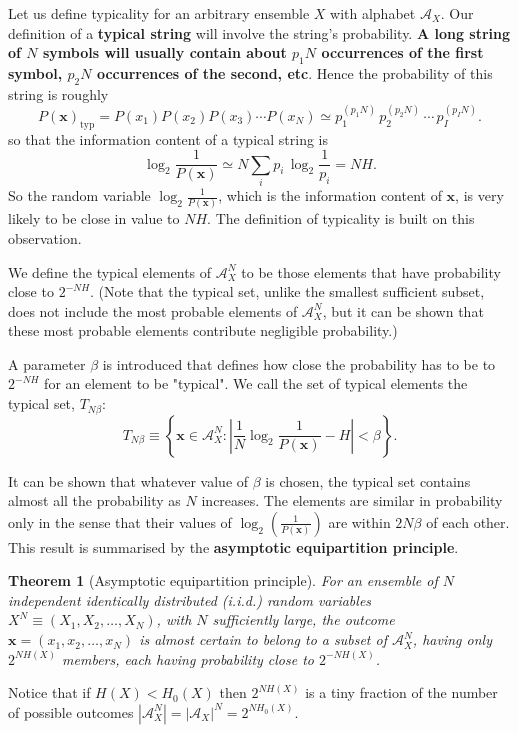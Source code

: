 \documentclass[11pt]{article}
\newtheorem{theorem}{Theorem}
\begin{document}
Let us define typicality for an arbitrary ensemble $X$ with alphabet $\mathcal{A}_X$. Our definition of a \textbf{typical string} will involve the string's probability. \textbf{A long string of $N$ symbols will usually contain about $p_1N$ occurrences of the first symbol, $p_2N$ occurrences of the second, etc}. Hence the probability of this string is roughly
\[
  P(\mathbf{x})_{\mathrm{typ}} = P(x_1)P(x_2)P(x_3)\cdots P(x_N) \simeq p_1^{(p_1N)}\,p_2^{(p_2N)}\,\cdots\,p_I^{(p_IN)}.
\]
so that the information content of a typical string is
\[
  \log_2\frac{1}{P(\mathbf{x})} \simeq N\sum_i p_i\,\log_2\frac{1}{p_i} = NH.
\]
So the random variable $\log_2\frac{1}{P(\mathbf{x})}$, which is the information content of $\mathbf{x}$, is very likely to be close in value to $NH$. The definition of typicality is built on this observation.

We define the typical elements of $\mathcal{A}_X^N$ to be those elements that have probability close to $2^{-NH}$. (Note that the typical set, unlike the smallest sufficient subset, does not include the most probable elements of $\mathcal{A}_X^N$, but it can be shown that these most probable elements contribute negligible probability.)

A parameter $\beta$ is introduced that defines how close the probability has to be to $2^{-NH}$ for an element to be "typical". We call the set of typical elements the typical set, $T_{N\beta}$:
\[
  T_{N\beta} \equiv \left\{\mathbf{x}\in \mathcal{A}_X^N : \left|\frac{1}{N}\log_2\frac{1}{P(\mathbf{x})} - H\right| < \beta\right\}.
\]

It can be shown that whatever value of $\beta$ is chosen, the typical set contains almost all the probability as $N$ increases. The elements are similar in probability only in the sense that their values of $\log_2(\frac{1}{P(\mathbf{x})})$ are within $2N\beta$ of each other. This result is summarised by the \textbf{asymptotic equipartition principle}.

\begin{theorem}[Asymptotic equipartition principle]
  For an ensemble of $N$ independent identically distributed (i.i.d.) random variables $X^N\equiv (X_1,X_2,\ldots,X_N)$, with $N$ sufficiently large, the outcome $\mathbf{x}=(x_1,x_2,\ldots,x_N)$ is almost certain to belong to a subset of $\mathcal{A}_X^N$, having only $2^{NH(X)}$ members, each having probability close to $2^{-NH(X)}$.
\end{theorem}

Notice that if $H(X) < H_0(X)$ then $2^{NH(X)}$ is a tiny fraction of the number of possible outcomes $|\mathcal{A}_X^N| = |\mathcal{A}_X|^N = 2^{NH_0(X)}$.
\end{document}
